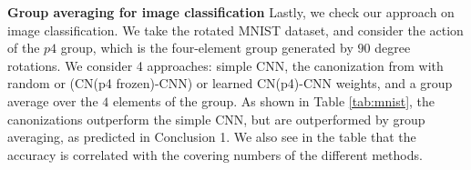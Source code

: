 \documentclass{article}
\newcommand{\nd}{\todo[color=blue!40]}
\theoremstyle{definition}
\theoremstyle{plain}
\begin{document}


\textbf{Group averaging for image classification} Lastly, we check our approach on image classification. We take the rotated MNIST \cite{larochelle2007empirical} dataset, and consider the action of the $p4$ group, which is the four-element group generated by $90$ degree rotations. We consider 4 approaches: simple CNN, the canonization from \cite{kaba2023equivariance} with random or (CN(p4 frozen)-CNN) or learned CN(p4)-CNN weights, and a group average over the $4$ elements of the group. As shown in Table \ref{tab:mnist}, the canonizations outperform the simple CNN, but are outperformed by group averaging, as predicted in Conclusion 1. We also see in the table that the accuracy is correlated with the covering numbers of the different methods.
 
\end{document}
